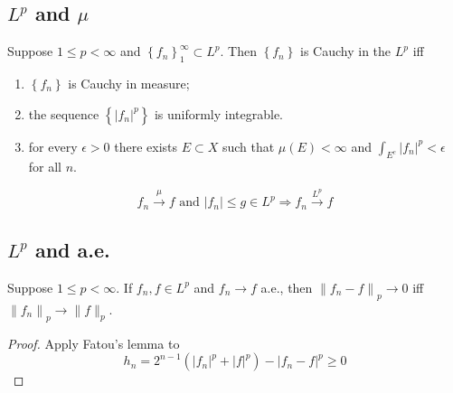 \documentclass[12pt, a4paper, oneside]{book}
\begin{document}
\subsection{$L^p$ and $\mu$}
\begin{proposition}
    Suppose $1 \leq p<\infty$ and $\left\{f_n\right\}_{1}^{\infty} \subset L^p$. Then $\left\{f_n\right\}$ is Cauchy in the $L^p$ iff
    \begin{enumerate}[label=(\roman*)]
        \item
              $\left\{f_n\right\}$ is Cauchy in measure;
        \item
              the sequence $\left\{\left|f_n\right|^p\right\}$ is uniformly integrable.
        \item
              for every $\epsilon>0$ there exists $E \subset X$ such that $\mu(E)<\infty$ and $\int_{E^c}\left|f_n\right|^p<\epsilon$ for all $n$.
    \end{enumerate}
\end{proposition}

\begin{corollary}
    \begin{equation*}
        f_n\xrightarrow{\mu} f \text{ and } \left|f_n\right|\leq g \in L^p \Rightarrow f_n\xrightarrow{L^p}f
    \end{equation*}
\end{corollary}


\subsection{$L^p$ and a.e.}

\begin{proposition}
    Suppose $1 \leq p<\infty$. If $f_n, f \in L^p$ and $f_n \rightarrow f$ a.e., then $\left\|f_n-f\right\|_p \rightarrow 0$ iff $\left\|f_n\right\|_p \rightarrow\|f\|_p$.
    \begin{proof}
        Apply Fatou's lemma to
        \begin{equation*}
            h_n=2^{n-1}\left(\left|f_n\right|^p+\left|f\right|^p\right)-\left|f_n-f\right|^{p}\geq 0
        \end{equation*}
    \end{proof}
\end{proposition}
\end{document}
